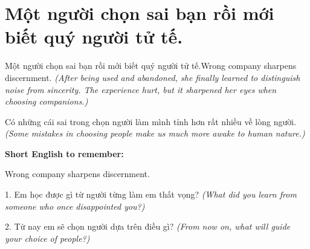 \section{Một người chọn sai bạn rồi mới biết quý người tử tế.}
\begin{truyen}{Một người chọn sai bạn rồi mới biết quý người tử tế.}{Wrong company sharpens discernment.}
\textit{(After being used and abandoned, she finally learned to distinguish noise from sincerity. The experience hurt, but it sharpened her eyes when choosing companions.)}
\end{truyen}
\begin{baihoc}
Có những cái sai trong chọn người làm mình tỉnh hơn rất nhiều về lòng người.
\textit{(Some mistakes in choosing people make us much more awake to human nature.)}
\end{baihoc}
\begin{ghinhoanh}\textbf{Short English to remember:}

Wrong company sharpens discernment.
\end{ghinhoanh}
\begin{tuhocnhanh}
1. Em học được gì từ người từng làm em thất vọng? \textit{(What did you learn from someone who once disappointed you?)}

2. Từ nay em sẽ chọn người dựa trên điều gì? \textit{(From now on, what will guide your choice of people?)}
\end{tuhocnhanh}
\ngancach

